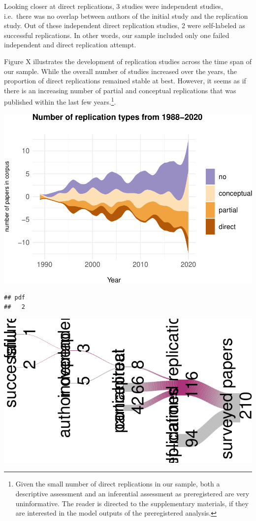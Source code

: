 \documentclass[]{elsarticle} %
\begin{document}
Looking closer at direct replications, 3 studies were independent
studies, i.e.~there was no overlap between authors of the initial study
and the replication study. Out of these independent direct replication
studies, 2 were self-labeled as successful replications. In other words,
our sample included only one failed independent and direct replication
attempt.

Figure X illustrates the development of replication studies across the
time span of our sample. While the overall number of studies increased
over the years, the proportion of direct replications remained stable at
best. However, it seems as if there is an increasing number of partial
and conceptual replications that was published within the last few
years.\footnote{Given the small number of direct replications in our
  sample, both a descriptive assessment and an inferential assessment as
  preregistered are very uninformative. The reader is directed to the
  supplementary materials, if they are interested in the model outputs
  of the preregistered analysis.}.

\begin{center}\includegraphics[width=1\linewidth]{ReplicationLing_files/figure-latex/steam_plot-1} \end{center}

\begin{verbatim}
## pdf 
##   2
\end{verbatim}

\includegraphics{ReplicationLing_files/figure-latex/river plot-1.pdf}
\end{document}
